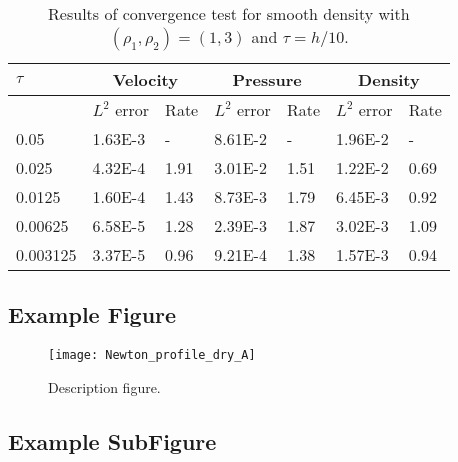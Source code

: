 \begin{table}[ht]
    \centering
    \begin{tabular}{|l|l|l||l|l||l|l|}
    \hline
         $\tau$ & \multicolumn{2}{|c||}{Velocity}   & \multicolumn{2}{c||}{Pressure} & \multicolumn{2}{c|}{Density}  \\ \hline
         & $L^2$ error & Rate & $L^2$ error & Rate & $L^2$ error & Rate \\ \hline
        0.05   	& 1.63E-3  & - 	&  8.61E-2 &- & 1.96E-2 & - \\ \hline
        0.025   & 4.32E-4 & 1.91 & 3.01E-2 & 1.51 & 1.22E-2 & 0.69 \\ \hline
        0.0125  & 1.60E-4 & 1.43 & 8.73E-3 & 1.79 & 6.45E-3 & 0.92 \\ \hline
        0.00625 & 6.58E-5 & 1.28 & 2.39E-3 & 1.87 & 3.02E-3 & 1.09 \\ \hline
        0.003125& 3.37E-5 & 0.96 & 9.21E-4 & 1.38 & 1.57E-3 & 0.94  \\ \hline
    \end{tabular}
\caption[Template table-description for list of tables.]{Results of convergence test for smooth density with $(\rho_1,\rho_2)=(1,3)$ and $\tau=h/10$.}
\label{table:template}
\end{table}


\subsection{Example Figure}

\begin{figure}[H]
     \centering         
     \texttt{[image: Newton\_profile\_dry\_A]} 
     \caption[Template figure-description for list of figures.]{Description figure.}
     \label{fig:template-fig}
\end{figure}

\subsection{Example SubFigure}


